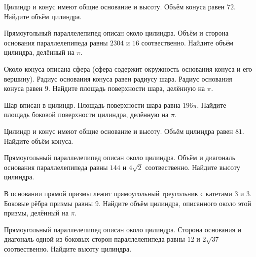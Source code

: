 \documentclass[4apaper]{article}
\begin{document}
\begin{taskBN}{50}
Цилиндр и конус имеют общие основание и высоту. Объём конуса равен $72$. Найдите объём цилиндра.
\end{taskBN}

\begin{taskBN}{51}
Прямоугольный параллелепипед описан около цилиндра. Объём и сторона основания параллелепипеда равны $2304$ и $16$ соотвественно. Найдите объём цилиндра, делённый на $\pi$.
\end{taskBN}

\begin{taskBN}{52}
Около конуса описана сфера (сфера содержит окружность основания конуса и его вершину).  Радиус основания конуса равен радиусу шара. Радиус основания конуса равен $9$. Найдите площадь поверхности шара, делённую на $\pi$.
\end{taskBN}

\begin{taskBN}{53}
Шар вписан в цилиндр. Площадь поверхности шара равна $196\pi$. Найдите площадь боковой поверхности цилиндра, делённую на $\pi$.
\end{taskBN}

\begin{taskBN}{54}
Цилиндр и конус имеют общие основание и высоту. Объём цилиндра равен $81$. Найдите объём конуса.
\end{taskBN}

\begin{taskBN}{55}
Прямоугольный параллелепипед описан около цилиндра. Объём и диагональ основания параллелепипеда равны $144$ и $4\sqrt{2}$ соотвественно. Найдите высоту цилиндра.
\end{taskBN}

\begin{taskBN}{56}
В основании прямой призмы лежит прямоугольный треугольник с катетами $3$ и $3$. Боковые рёбра призмы равны $9$. Найдите объём цилиндра, описанного около этой призмы, делённый на $\pi$.
\end{taskBN}

\begin{taskBN}{57}
Прямоугольный параллелепипед описан около цилиндра. Сторона основания и диагональ одной из боковых сторон параллелепипеда равны $12$ и $2\sqrt{37}$ соотвественно. Найдите высоту цилиндра.
\end{taskBN}
\end{document}
